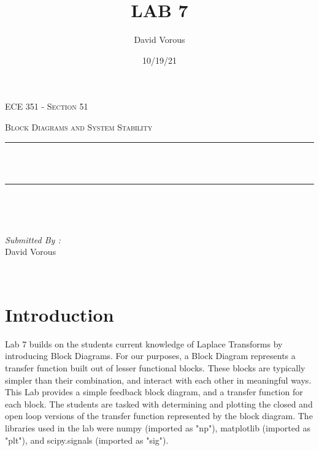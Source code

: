 \documentclass[12pt]{report}
\title{LAB 7}
\author{ David Vorous}
\date{10/19/21}
\makeatletter
\let\thetitle\@title
\makeatother
\begin{document}
\begin{titlepage}
	\centering
    \vspace*{0.5 cm}
\begin{center}    \textsc{\Large   ECE 351 - Section 51 }\\[2.0 cm]	\end{center}
	\textsc{\Large Block Diagrams and System Stability  }\\[0.5 cm]
	\rule{\linewidth}{0.2 mm} \\[0.4 cm]
	{ \huge \bfseries \thetitle}\\
	\rule{\linewidth}{0.2 mm} \\[1.5 cm]
	
	\begin{minipage}{0.4\textwidth}
		\begin{flushleft} \large
			\end{flushleft}
			\end{minipage}~
			\begin{minipage}{0.4\textwidth}
            
			\begin{flushright} \large
			\emph{Submitted By :} \\
			David Vorous  
		\end{flushright}
           
	\end{minipage}\\[2 cm]

\end{titlepage}


\tableofcontents

\pagebreak

\renewcommand{\thesection}{\arabic{section}}

\section{Introduction}

Lab 7 builds on the students current knowledge of Laplace Transforms by introducing Block Diagrams. For our purposes, a Block Diagram represents a transfer function built out of lesser functional blocks. These blocks are typically simpler than their combination, and interact with each other in meaningful ways. This Lab provides a simple feedback block diagram, and a transfer function for each block. The students are tasked with determining and plotting the closed and open loop versions of the transfer function represented by the block diagram. The libraries used in the lab were numpy (imported as "np"), matplotlib (imported as "plt"), and scipy.signals (imported as "sig").
\end{document}
